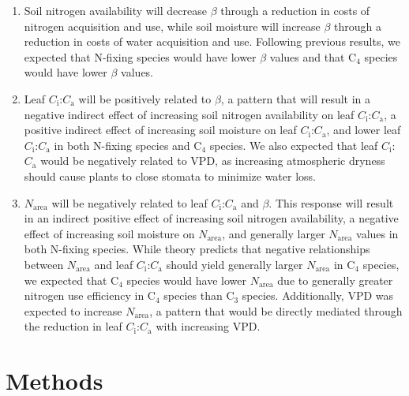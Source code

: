 \begin{enumerate}
    \item Soil nitrogen availability will decrease $\beta$ through a reduction in costs of nitrogen acquisition and use, while soil moisture will increase $\beta$ through a reduction in costs of water acquisition and use. Following previous results, we expected that N-fixing species would have lower $\beta$ values and that C$_4$ species would have lower $\beta$ values.
    
    \item Leaf $C_\mathrm{i}$:$C_\mathrm{a}$ will be positively related to $\beta$, a pattern that will result in a negative indirect effect of increasing soil nitrogen availability on leaf $C_\mathrm{i}$:$C_\mathrm{a}$, a positive indirect effect of increasing soil moisture on leaf $C_\mathrm{i}$:$C_\mathrm{a}$, and lower leaf $C_\mathrm{i}$:$C_\mathrm{a}$ in both N-fixing species and C$_4$ species. We also expected that leaf $C_\mathrm{i}$:$C_\mathrm{a}$ would be negatively related to VPD, as increasing atmospheric dryness should cause plants to close stomata to minimize water loss.

    \item $N_\mathrm{area}$ will be negatively related to leaf $C_\mathrm{i}$:$C_\mathrm{a}$ and $\beta$. This response will result in an indirect positive effect of increasing soil nitrogen availability, a negative effect of increasing soil moisture on $N_\mathrm{area}$, and generally larger $N_\mathrm{area}$ values in both N-fixing species. While theory predicts that negative relationships between $N_\mathrm{area}$ and leaf $C_\mathrm{i}$:$C_\mathrm{a}$ should yield generally larger $N_\mathrm{area}$ in C$_4$ species, we expected that C$_4$ species would have lower $N_\mathrm{area}$ due to generally greater nitrogen use efficiency in C$_4$ species than C$_3$ species. Additionally, VPD was expected to increase $N_\mathrm{area}$, a pattern that would be directly mediated through the reduction in leaf $C_\mathrm{i}$:$C_\mathrm{a}$ with increasing VPD.
\end{enumerate}

\section{Methods}
